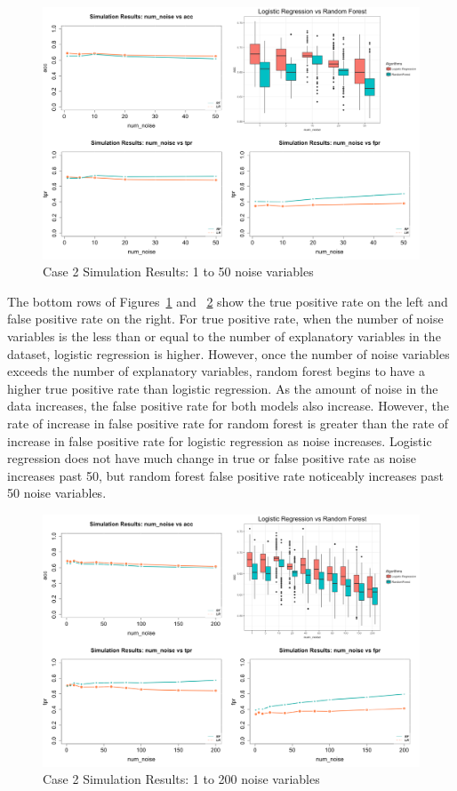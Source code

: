 \documentclass{llncs}
\begin{document}
\begin{figure}
\centering
\includegraphics[scale=0.55]{case2.png}
\caption{Case 2 Simulation Results: 1 to 50 noise variables}
\label{fig:case2results}
\end{figure}

The bottom rows of Figures~\ref{fig:case2results} and ~\ref{fig:case2resultsb} show the true positive rate on the left and false positive rate on the right.  For true positive rate, when the number of noise variables is the less than or equal to the number of explanatory variables in the dataset, logistic regression is higher.  However, once the number of noise variables exceeds the number of explanatory variables, random forest begins to have a higher true positive rate than logistic regression.  As the amount of noise in the data increases, the false positive rate for both models also increase.  However, the rate of increase in false positive rate for random forest is greater than the rate of increase in false positive rate for logistic regression as noise increases.  Logistic regression does not have much change in true or false positive rate as noise increases past 50, but random forest false positive rate noticeably increases past 50 noise variables.

\begin{figure}
\centering
\includegraphics[scale=0.55]{case2_b.png}
\caption{Case 2 Simulation Results: 1 to 200 noise variables}
\label{fig:case2resultsb}
\end{figure}
\end{document}
